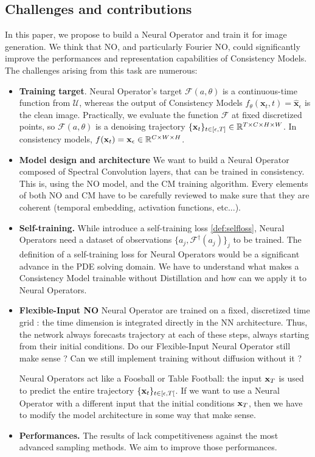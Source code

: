 \subsection{Challenges and contributions}

In this paper, we propose to build a Neural Operator and train it for image generation. We think that NO, and particularly Fourier NO, could significantly improve the performances and representation capabilities of Consistency Models. The challenges arising from this task are numerous:
\begin{itemize}
    \item \textbf{Training target}. Neural Operator's target $\mathcal{F}(a, \theta)$ is a continuous-time function from $\mathcal{U}$, whereas the output of Consistency Models $f_{\theta}(\mathbf{x}_t, t) = \widehat{\mathbf{x}}_{\epsilon}$ is the clean image. Practically, we evaluate the function $\mathcal{F}$ at fixed discretized points, so $\mathcal{F}(a, \theta)$ is a denoising trajectory $\{\mathbf{x}_t \}_{t \in [\epsilon, T]} \in \mathbb{R}^{T \times C \times H \times W}$. In consistency models, $f(\mathbf{x}_t) = \mathbf{x}_{\epsilon} \in \mathbb{R}^{C \times W \times H}$.
    \item \textbf{Model design and architecture} We want to build a Neural Operator composed of Spectral Convolution layers, that can be trained in consistency. This is, using the NO model, and the CM training algorithm. Every elements of both NO and CM have to be carefully reviewed to make sure that they are coherent (temporal embedding, activation functions, etc...).
    \item \textbf{Self-training.} While \cite{song2023consistencymodels} introduce a self-training loss \ref{def:selfloss}, Neural Operators need a dataset of observations $\{a_j,  \mathcal{F}^{\dagger}(a_j)\}_j$ to be trained. The definition of a self-training loss for Neural Operators would be a significant advance in the PDE solving domain. We have to understand what makes a Consistency Model trainable without Distillation and how can we apply it to Neural Operators. \item \textbf{Flexible-Input NO} Neural Operator are trained on a fixed, discretized time grid : the time dimension is integrated directly in the NN architecture. Thus, the network always forecasts trajectory at each of these steps, always starting from their initial conditions. Do our Flexible-Input Neural Operator still make sense ? Can we still implement training without diffusion without it ?

    Neural Operators act like a Foosball or Table Football: the input $\mathbf{x}_T$ is used to predict the entire trajectory $\{\mathbf{x}_t \}_{t \in [\epsilon, T[}$. If we want to use a Neural Operator with a different input that the initial conditions $\mathbf{x}_T$, then we have to modify the model architecture in some way that make sense. 
    \item \textbf{Performances.} The results of \cite{zheng2023fastsamplingdiffusionmodels} lack competitiveness against the most advanced sampling methods. We aim to improve those performances.
\end{itemize}